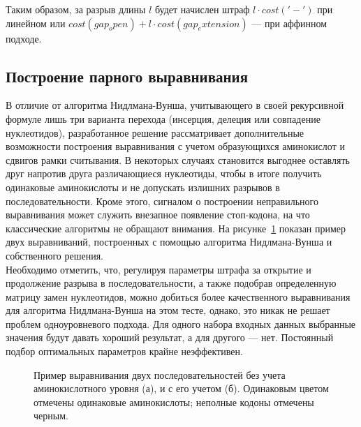 \indent Таким образом, за разрыв длины $l$ будет начислен штраф $l\cdot cost('-')$ при линейном или $cost(gap_open) + l\cdot cost(gap_extension)$ --- при аффинном подходе.

\subsection[Построение парного выравнивания]{\large Построение парного выравнивания} \label{PairwiseAlign}
\hspace{\parindent} В отличие от алгоритма Нидлмана-Вунша, учитывающего в своей рекурсивной формуле лишь три варианта перехода (инсерция, делеция или совпадение нуклеотидов), разработанное решение рассматривает дополнительные возможности построения выравнивания с учетом образующихся аминокислот и сдвигов рамки считывания. В некоторых случаях становится выгоднее оставлять друг напротив друга различающиеся нуклеотиды, чтобы в итоге получить одинаковые аминокислоты и не допускать излишних разрывов в последовательности. Кроме этого, сигналом о построении неправильного выравнивания может служить внезапное появление стоп-кодона, на что классические алгоритмы не обращают внимания. На рисунке~\ref{ris:NWvsMULTY} показан пример двух выравниваний, построенных с помощью алгоритма Нидлмана-Вунша и собственного решения. \\
\indent Необходимо отметить, что, регулируя параметры штрафа за открытие и продолжение разрыва в последовательности, а также подобрав определенную матрицу замен нуклеотидов, можно добиться более качественного выравнивания для алгоритма Нидлмана-Вунша на этом тесте, однако, это никак не решает проблем одноуровневого подхода. Для одного набора входных данных выбранные значения будут давать хороший результат, а для другого --- нет. Постоянный подбор оптимальных параметров крайне неэффективен.

\begin{figure}[h]
	\begin{minipage}[h]{0.49\linewidth}
	\end{minipage}
	\hfill
	\begin{minipage}[h]{0.49\linewidth}
	\end{minipage}
	\caption{Пример выравнивания двух последовательностей без учета аминокислотного уровня (а), и с его учетом (б). Одинаковым цветом отмечены одинаковые аминокислоты; неполные кодоны отмечены черным.}
	\label{ris:NWvsMULTY}
\end{figure}

